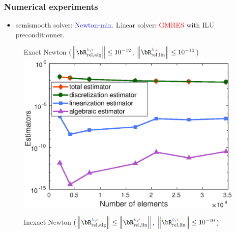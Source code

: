 \begin{frame}
\frametitle{Numerical experiments}

\begin{itemize}
\item 
semismooth solver: \textcolor{blue}{Newton-min}. Linear solver: \textcolor{red}{GMRES} with ILU preconditionner.
\end{itemize}


\begin{figure}
\begin{minipage}[c]{.333\linewidth}
   \centering
   \quad \small{Exact Newton} \scriptsize{\hspace{3 cm} (\textcolor{midnightblue}{$\left\|\bR_{\mathrm{rel,alg}}^{\kk,\ii}\right\| \leq 10^{-12}$, $\left\|\bR_{\mathrm{rel,lin}}^{\kk,\ii}\right\| \leq 10^{-10}$})}
\includegraphics[width=\textwidth]{fig_article_chap_1/exact_resolution_convergence_estimator_number_elements.eps}    
\end{minipage}\hfill
\begin{minipage}[c]{.333\linewidth}
   \centering
   \quad \small{Inexact Newton} \hspace{3 cm} \scriptsize{(\textcolor{midnightblue}{$\left\|\bR_{\mathrm{rel,alg}}^{\kk,\ii}\right\| \leq \left\|\bR_{\mathrm{rel,lin}}^{\kk,\ii}\right\|$, $\left\|\bR_{\mathrm{rel,lin}}^{\kk,\ii}\right\| \leq 10^{-10}$})}

\end{minipage}
\end{figure}
\end{frame}
